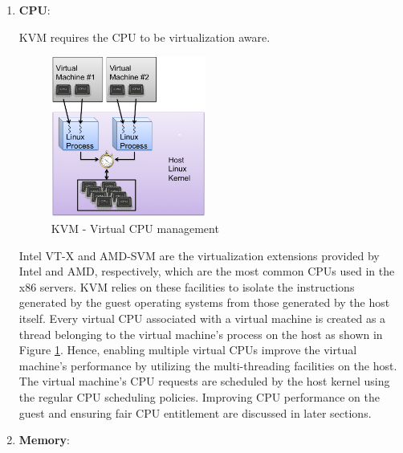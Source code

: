 \begin{enumerate}
\item \textbf{CPU}:

KVM requires the CPU to be virtualization aware. 
\begin{figure}[htbp]
\centering
    \includegraphics[width=0.48\textwidth]{kvm-cpu.png}
  \caption{KVM - Virtual CPU management}
  \label{img_kvm_thread}
\end{figure}
Intel VT-X \cite{intelvtx} and AMD-SVM \cite{amdv} are the virtualization extensions provided by Intel and AMD, respectively, which are the most common CPUs used in the x86 servers. KVM relies on these facilities to isolate the instructions generated by the guest operating systems from those generated by the host itself. Every virtual CPU associated with a virtual machine is created as a thread belonging to the virtual machine's process on the host as shown in Figure \ref{img_kvm_thread}. Hence, enabling multiple virtual CPUs improve the virtual machine's performance by utilizing the multi-threading facilities on the host. The virtual machine's CPU requests are scheduled by the host kernel using the regular CPU scheduling policies. Improving CPU performance on the guest and ensuring fair CPU entitlement are discussed in later sections.   

\item \textbf{Memory}:


\end{enumerate}
